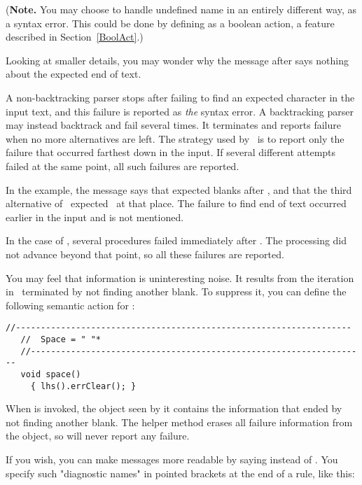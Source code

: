 (\textbf{Note.} 
You may choose to handle undefined name in an entirely different way,
as a syntax error.
This could be done by defining  as a boolean action,
a feature described in Section~\ref{BoolAct}.)

\medskip
Looking at smaller details,
you may wonder why the message after  says nothing about the expected end of text.

A non-backtracking parser stops after failing to find an expected character
in the input text, and this failure
is reported as \emph{the} syntax error.
A backtracking parser may instead backtrack
and fail several times.  
It terminates and reports failure when no more
alternatives are left.
The strategy used by \Mouse\ is to report only the failure that occurred 
farthest down in the input.
If several different attempts failed at the same point,
all such failures are reported.

In the example, the message says that  expected blanks after ,
and that the third alternative of \Factor\ expected \Sum\ at that place.
The failure to find end of text occurred earlier in the input and is not mentioned.

\medskip
In the case of , several procedures failed immediately after .
The processing did not advance beyond that point, so all these failures are reported.

You may feel that information  is uninteresting noise.
It results from the iteration in \Space\ terminated by not finding another blank.
To suppress it, you can define the following semantic action for :
%
\small
\begin{Verbatim}[frame=single,framesep=2mm,samepage=true,xleftmargin=15mm,xrightmargin=15mm,baselinestretch=0.8]
   //-------------------------------------------------------------------
   //  Space = " "*
   //-------------------------------------------------------------------
   void space()
     { lhs().errClear(); }
\end{Verbatim}
\normalsize
%
When  is invoked, the  object seen by it
contains the information that  ended
by not finding another blank.
The helper method  erases all failure information
from the  object, so  will never report any failure.

If you wish, you can make messages more readable by saying
 instead of .
You specify such "diagnostic names" in pointed brackets at the end of a rule, like this:

